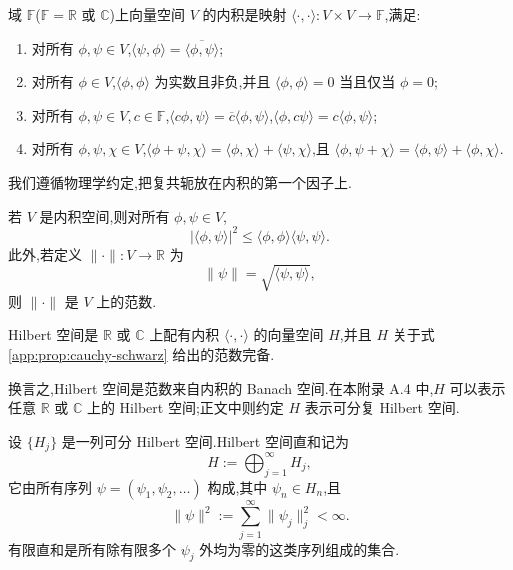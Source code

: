 \begin{definition}[内积]\label{app:def:inner-product}
域 \(\mathbb F\)(\(\mathbb F=\mathbb R\) 或 \(\mathbb C\))上向量空间 \(V\) 的内积是映射 \(\langle\cdot,\cdot\rangle:V\times V\to\mathbb F\),满足:
\begin{enumerate}
  \item 对所有 \(\phi,\psi\in V\),\(\langle\psi,\phi\rangle=\overline{\langle\phi,\psi\rangle}\);
  \item 对所有 \(\phi\in V\),\(\langle\phi,\phi\rangle\) 为实数且非负,并且 \(\langle\phi,\phi\rangle=0\) 当且仅当 \(\phi=0\);
  \item 对所有 \(\phi,\psi\in V,c\in\mathbb F\),\(\langle c\phi,\psi\rangle=\overline c\langle\phi,\psi\rangle\),\(\langle\phi,c\psi\rangle=c\langle\phi,\psi\rangle\);
  \item 对所有 \(\phi,\psi,\chi\in V\),\(\langle\phi+\psi,\chi\rangle=\langle\phi,\chi\rangle+\langle\psi,\chi\rangle\),且 \(\langle\phi,\psi+\chi\rangle=\langle\phi,\psi\rangle+\langle\phi,\chi\rangle\).
\end{enumerate}
\end{definition}

\begin{note}
我们遵循物理学约定,把复共轭放在内积的第一个因子上.
\end{note}

\begin{proposition}\label{app:prop:cauchy-schwarz}
若 \(V\) 是内积空间,则对所有 \(\phi,\psi\in V\),
\[
|\langle\phi,\psi\rangle|^2\le\langle\phi,\phi\rangle\langle\psi,\psi\rangle.
\]
此外,若定义 \(\|\cdot\|:V\to\mathbb R\) 为
\[
\|\psi\|=\sqrt{\langle\psi,\psi\rangle},\tag{A.7}
\]
则 \(\|\cdot\|\) 是 \(V\) 上的范数.
\end{proposition}

\begin{definition}[Hilbert 空间]\label{app:def:hilbert}
Hilbert 空间是 \(\mathbb R\) 或 \(\mathbb C\) 上配有内积 \(\langle\cdot,\cdot\rangle\) 的向量空间 \(H\),并且 \(H\) 关于式 \ref{app:prop:cauchy-schwarz} 给出的范数完备.
\end{definition}

换言之,Hilbert 空间是范数来自内积的 Banach 空间.在本附录 A.4 中,\(H\) 可以表示任意 \(\mathbb R\) 或 \(\mathbb C\) 上的 Hilbert 空间;正文中则约定 \(H\) 表示可分复 Hilbert 空间.

\begin{definition}\label{app:def:hilbert-direct-sum}
设 \(\{H_j\}\) 是一列可分 Hilbert 空间.Hilbert 空间直和记为
\[
H:=\bigoplus_{j=1}^{\infty}H_j,\tag{A.8}
\]
它由所有序列 \(\psi=(\psi_1,\psi_2,\ldots)\) 构成,其中 \(\psi_n\in H_n\),且
\[
\|\psi\|^2:=\sum_{j=1}^{\infty}\|\psi_j\|_j^2<\infty.
\]
有限直和是所有除有限多个 \(\psi_j\) 外均为零的这类序列组成的集合.
\end{definition}

